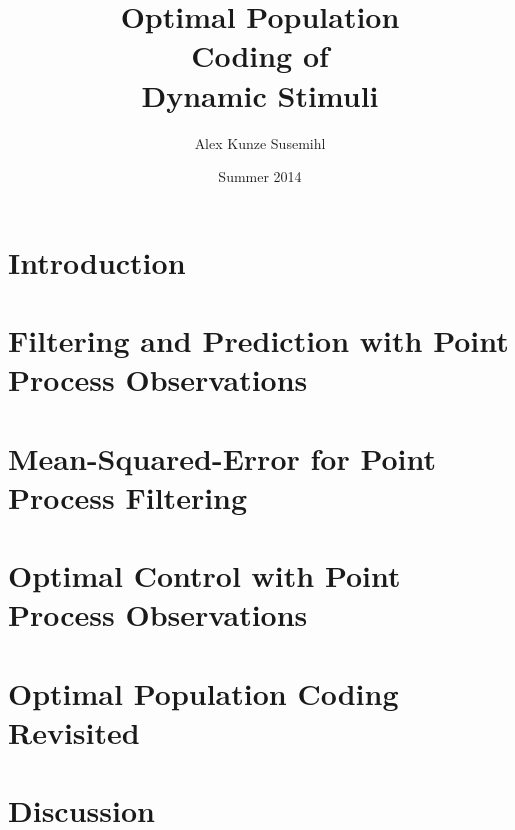 \documentclass[nobib,justified]{tufte-latex-3.5.0/tufte-book}%
\title[Optimal Population Coding of Dynamic Stimuli]{\setlength{\parindent}{0pt}Optimal Population\\
Coding of\\
Dynamic Stimuli\\
\vspace{2cm}
\usebox{\titleimage}}
\author{Alex Kunze Susemihl}
\date{Summer 2014}							%
\begin{document}
\maketitle
\setcounter{tocdepth}{2}
\setcounter{secnumdepth}{1}
\tableofcontents
\chapter{Introduction}

\label{chap:intro}



\chapter{Filtering and Prediction with Point Process Observations}

\label{chap:filtering}



\chapter{Mean-Squared-Error for Point Process Filtering}

\label{chap:mse}



\chapter{Optimal Control with Point Process Observations}

\label{chap:control}



\chapter{Optimal Population Coding Revisited}

\label{chap:optimal}



\chapter{Discussion}

\printbibliography
\end{document}
